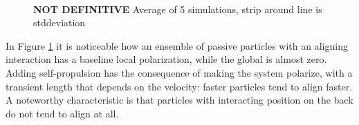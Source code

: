 \documentclass[../../master_thesis_np.tex]{subfiles}
\begin{document}
		\begin{figure}[htp]
			\centering
			\\
			
			\caption{\textbf{NOT DEFINITIVE}  Average of 5 simulations, strip around line is stddeviation}
			\label{fig:lj_velocity_pol}
		\end{figure}
		
		In Figure \ref{fig:lj_velocity_pol} it is noticeable how an ensemble of passive particles with an aligning interaction has a baseline local polarization, while the global is almost zero. 
		Adding self-propulsion has the consequence of making the system polarize, with a transient length that depends on the velocity: faster particles tend to align faster. 
		A noteworthy characteristic is that particles with interacting position on the back do not tend to align at all.
		
\end{document}

